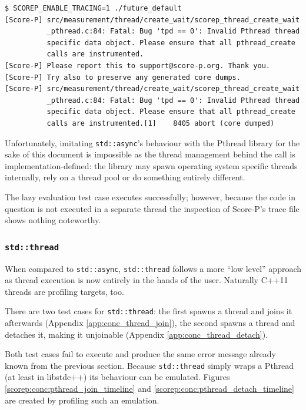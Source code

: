 \begin{verbatim}
$ SCOREP_ENABLE_TRACING=1 ./future_default                                      
[Score-P] src/measurement/thread/create_wait/scorep_thread_create_wait
          _pthread.c:84: Fatal: Bug 'tpd == 0': Invalid Pthread thread
          specific data object. Please ensure that all pthread_create
          calls are instrumented.
[Score-P] Please report this to support@score-p.org. Thank you.
[Score-P] Try also to preserve any generated core dumps.
[Score-P] src/measurement/thread/create_wait/scorep_thread_create_wait
          _pthread.c:84: Fatal: Bug 'tpd == 0': Invalid Pthread thread
          specific data object. Please ensure that all pthread_create
          calls are instrumented.[1]    8405 abort (core dumped)
\end{verbatim}

\noindent Unfortunately, imitating \texttt{std::async}'s behaviour with the Pthread library for the sake of this document is impossible as the thread management behind the call is implementation-defined: the library may spawn operating system specific threads internally, rely on a thread pool or do something entirely different.

The lazy evaluation test case executes successfully; however, because the code in question is not executed in a separate thread the inspection of Score-P's trace file shows nothing noteworthy.

\subsubsection{\texttt{std::thread}}\label{scorep:conc:thread}

When compared to \texttt{std::async}, \texttt{std::thread} follows a more ``low level'' approach as thread execution is now entirely in the hands of the user. Naturally C++11 threads are profiling targets, too.

There are two test cases for \texttt{std::thread}: the first spawns a thread and joins it afterwards (Appendix \ref{app:conc_thread_join}), the second spawns a thread and detaches it, making it unjoinable (Appendix \ref{app:conc_thread_detach}).

Both test cases fail to execute and produce the same error message already known from the previous section. Because \texttt{std::thread} simply wraps a Pthread (at least in libstdc++) its behaviour can be emulated. Figures \ref{scorep:conc:pthread_join_timeline} and \ref{scorep:conc:pthread_detach_timeline} are created by profiling such an emulation.


